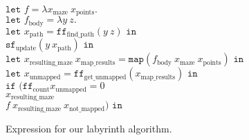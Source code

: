\begin{figure}[p]
    $\texttt{let } f = \lambda x_{\text{maze}}\ x_{\text{points}}.$\\
    \hspace*{.3cm}$\texttt{let } f_\text{body} = \lambda y\ z.$\\
    \hspace*{.6cm}$\texttt{let } x_\text{path} = \texttt{ff}_\text{find\_path} (y\ z) \texttt{ in}$\\
    \hspace*{.9cm}$\texttt{sf}_\text{update}(y\ x_\text{path}) \texttt{ in}$\\
    \hspace*{.6cm}$\texttt{let } x_\text{resulting\_maze}\ x_\text{map\_results} = \texttt{map} (f_\text{body}\ x_\text{maze}\ x_\text{points}) \texttt{ in}$\\
    \hspace*{.9cm}$\texttt{let } x_\text{unmapped} = \texttt{ff}_\text{get\_unmapped} (x_\text{map\_results}) \texttt{ in}$\\
    \hspace*{1.2cm}$\texttt{if } ( \texttt{ff}_\text{count} x_\text{unmapped} = 0$\\
    \hspace*{2cm}$x_\text{resulting\_maze}$\\
    \hspace*{2cm}$f\ x_\text{resulting\_maze}\ x_\text{not\_mapped}) \texttt{ in}$\\
    \caption{Expression for our labyrinth algorithm.}%
    \label{fig:transformations:ir-first-stage}
\end{figure}

